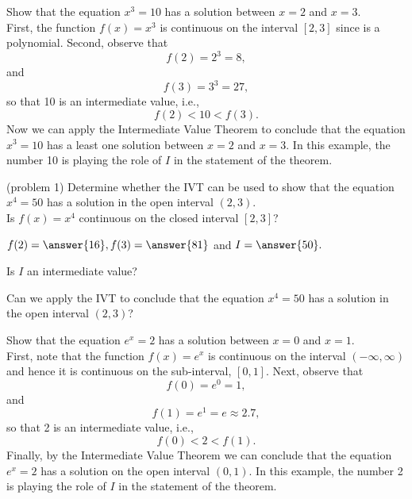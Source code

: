 \documentclass[handout]{ximera}
\begin{document}
\begin{example}[example 1]
Show that the equation $x^3 = 10$ has a solution between $x = 2$ and $x = 3$.\\
First, the function $f(x) = x^3$  is continuous on the interval $[2,3]$ 
since is a polynomial. 
Second, observe that 
\[
f(2) = 2^3 = 8,
\]
and 
\[
f(3) = 3^3 = 27,
\] 
so that 10 is an intermediate value, i.e.,
\[f(2) < 10 < f(3).\]
Now we can apply the Intermediate Value Theorem to
conclude that the equation $x^3 = 10$ has a least one solution between $x=2$ and $x=3$. 
In this example, the number 10 is playing the role of $I$ in the statement of the theorem.
\end{example}


\begin{problem}(problem 1)
Determine whether the IVT can be used to show that the equation $x^4 = 50$ has a solution in the open interval $(2,3)$.\\

Is $f(x) = x^4$ continuous on the closed interval $[2,3]$? 
\begin{center}
\begin{multipleChoice}
\end{multipleChoice}
\end{center}


$f(2) = \answer{16}, f(3) = \answer{81}$ and $I = \answer{50}.$

Is $I$ an intermediate value? 
\begin{multipleChoice}
\end{multipleChoice}

Can we apply the IVT to conclude that the equation $x^4 = 50$ has a solution in the open interval $(2, 3)$?
\begin{multipleChoice}
\end{multipleChoice}
\end{problem}




\begin{example}[example 2]
Show that the equation $e^x =2$ has a solution between $x = 0$ and $x = 1$.\\

First, note that the function $f(x) = e^x$ is continuous on the 
interval $(-\infty, \infty)$ and hence it is continuous on the sub-interval, $[0, 1]$. 
Next, observe that 
\[
f(0) = e^0 = 1,
\]
and 
\[
f(1) = e^1 = e \approx 2.7,
\]
 so that 2 is an intermediate value, i.e.,
\[f(0) < 2 < f(1).\]
Finally, by the Intermediate Value Theorem we can 
conclude that the equation $e^x = 2$ has a solution on the open interval $(0,1)$.
In this example, the number 2 is playing the role of $I$ in the statement of the theorem.
\end{example}
\end{document}
